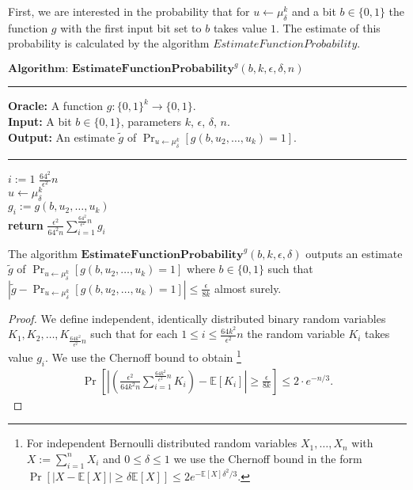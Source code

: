 First, we are interested in the probability that for $u \leftarrow \mu_{\delta}^k$ and a bit $b \in \{0,1\}$ the function $g$
with the first input bit set to $b$ takes value $1$. The estimate of this probability is calculated by the algorithm
$EstimateFunctionProbability$.
%
\begin{codeblock}
  $\textbf{Algorithm: EstimateFunctionProbability}^{g}(b, k, \epsilon, \delta, n)$
  \medskip
  \hrule
  \medskip
  \textbf{Oracle:} A function $g : \{0,1\}^{k} \rightarrow \{0,1\}$.\\
  \textbf{Input:} A bit $b \in \{0,1\}$, parameters $k$, $\epsilon$, $\delta$, $n$. \\
  \textbf{Output:} An estimate $\widetilde{g}$ of $\Pr_{u \leftarrow \mu_{\delta}^{k}}[g(b,u_2, \dots, u_k) = 1]$.
  \medskip\hrule\medskip
  \For $i:=1$ \To $\frac{64^2}{\epsilon^2} n$ \Do \\
  \IndI $u \leftarrow \mu_{\delta}^{k}$ \\
  \IndI $g_i := g(b, u_2, \dots, u_k)$ \\
  \textbf{return} $\frac{\epsilon^2}{64^2n} \sum_{i=1}^{\frac{64^2}{\epsilon^2} n} g_i$
\end{codeblock}
%
\begin{lemma}
  \label{lemma:estimate_of_g}
  The algorithm $\textbf{EstimateFunctionProbability}^{g}(b, k, \epsilon, \delta)$ outputs an estimate $\widetilde{g}$
  of $\Pr_{u \leftarrow \mu_{\delta}^k}[g(b, u_2, \dots, u_k) = 1]$ where $b \in \{0,1\}$
  such that $| \widetilde{g} - \Pr_{u \leftarrow \mu_{\delta}^{k}}\left[g(b,u_2, \dots, u_k) = 1\right] | \leq \frac{\epsilon}{8k}$ almost surely.
\end{lemma}
%
\begin{proof}
We define independent, identically distributed binary random variables $K_1, K_2, \dots, K_{\frac{64k^2}{\epsilon^2} n}$
such that for each $1 \leq i \leq \frac{64k^2}{\epsilon^2} n$
the random variable $K_i$ takes value $g_i$. We use the Chernoff bound to obtain
\footnote{For independent Bernoulli distributed random variables $X_1, \dots, X_n$ with $X := \sum_{i=1}^n X_i$ and $0 \leq \delta \leq 1$
  we use the Chernoff bound in the form $\Pr[|X - \mathbb{E}[X]| \geq \delta \mathbb{E}[X]] \leq 2 e^{- \mathbb{E}[X] \delta^2 / 3}$.}
\begin{align*}
  \Pr \left[\left|\left(\frac{\epsilon^2}{64k^2n} \sum_{i=1}^{\frac{64k^2}{\epsilon^2}n } K_i \right) - \mathbb{E}[K_i]\right|
    \geq \frac{\epsilon}{8k} \right] \leq 2 \cdot e^{-n/3}.
\end{align*}
\end{proof}
